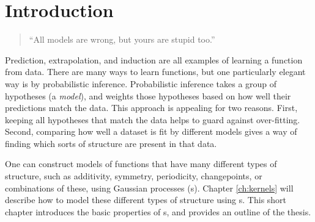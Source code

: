 
\inbpdocument

\chapter{Introduction}
\label{ch:intro}




\begin{quotation}
``All models are wrong, but yours are stupid too.'' \\
\hspace*{\fill} \citet{mlhipster}
\end{quotation}

Prediction, extrapolation, and induction are all examples of learning a function from data.
There are many ways to learn functions, but one particularly elegant way is by probabilistic inference.
Probabilistic inference takes a group of hypotheses (a \emph{model}), and weights those hypotheses based on how well their predictions match the data.
This approach is appealing for two reasons.
First, keeping all hypotheses that match the data helps to guard against over-fitting.
Second, comparing how well a dataset is fit by different models gives a way of finding which sorts of structure are present in that data. %

One can construct models of functions that have many different types of structure, such as additivity, symmetry, periodicity, changepoints, or combinations of these, using Gaussian processes (\gp{}s).
%
%
Chapter \ref{ch:kernels} will describe how to model these different types of structure using \gp{}s.
This short chapter introduces the basic properties of \gp{}s, and provides an outline of the thesis.



